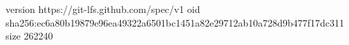version https://git-lfs.github.com/spec/v1
oid sha256:ec6a80b19879e96ea49322a6501bc1451a82e29712ab10a728d9b477f17dc311
size 262240
